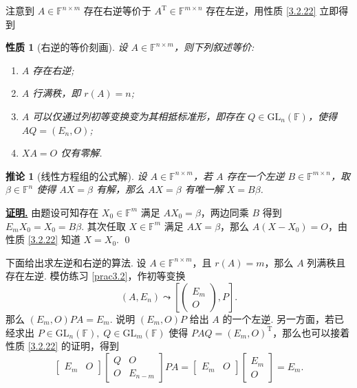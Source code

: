\documentclass[10pt,openany]{article}
\theoremstyle{thmstyle} %
\theoremstyle{defstyle} %
\newtheorem{corollary}[theorem]{推论}
\theoremstyle{prostyle} %
\newtheorem{property}[theorem]{性质}
\theoremstyle{exastyle}
\theoremstyle{remstyle}
\renewenvironment{proof}[1][证明]{\par\underline{\textbf{#1.}} \;\fangsong}{\qed\par}
\newcommand{\T}{^{\text{T}}}
\newcommand{\F}{\mathbb{F}}
\newcommand{\gfn}{\text{GL}_n(\mathbb{F})}
\newcommand{\gfm}{\text{GL}_m(\mathbb{F})}
\newcommand{\mn}{^{m \times n}}
\newcommand{\nm}{^{n \times m}}
\begin{document}
注意到 \( A \in \F\nm \) 存在右逆等价于 \( A\T \in \F\mn \) 存在左逆，用性质  \ref{3.2.22} 立即得到

\begin{property}[右逆的等价刻画] \label{3.2.23}
	设 \( A \in \F\nm \)，则下列叙述等价:
	\begin{enumerate}[(1)]
		\item \( A \) 存在右逆;
		\item \( A \) 行满秩，即 \( r(A)=n \);
		\item \( A \) 可以仅通过列初等变换变为其相抵标准形，即存在 \( Q \in \gfn \)，使得 \( AQ=(E_n,O) \);
		\item \( XA=O \) 仅有零解.
	\end{enumerate}
\end{property}

\begin{corollary}[线性方程组的公式解] \label{3.2.24}
	设 \( A \in \F\nm \)，若 \( A \) 存在一个左逆 \( B \in \F\mn \)，取 \( \beta \in \F^n \) 使得 \( AX=\beta \) 有解，那么 \( AX=\beta \) 有唯一解 \( X=B \beta \).
\end{corollary}

\begin{proof}
	由题设可知存在 \( X_0 \in \F^m \) 满足 \( AX_0=\beta \)，两边同乘 \( B \) 得到 \( E_mX_0=X_0=B\beta \). 其次任取 \( X \in \F^m \) 满足 \( AX=\beta \)，那么 \( A(X-X_0)=O \)，由性质 \ref{3.2.22} 知道 \( X=X_0 \). 
\end{proof}

下面给出求左逆和右逆的算法. 设 \( A \in \F\nm \)，且 \( r(A)=m \)，那么 \( A \) 列满秩且存在左逆. 模仿练习 \ref{prac3.2}，作初等变换
\[ (A,E_n) \leadsto \left[ \begin{pmatrix}
	E_m \\ O
\end{pmatrix}, P \right]. \]
那么 \( (E_m,O)PA=E_m \). 说明 \( (E_m,O)P \) 给出 \( A \) 的一个左逆. 另一方面，若已经求出 \( P \in \gfn, \; Q \in \gfm \) 使得 \( PAQ=(E_m,O)\T \)，那么也可以接着性质 \ref{3.2.22} 的证明，得到
\[ \begin{bmatrix}
	E_m & O
\end{bmatrix}\begin{bmatrix}
Q & O \\
O & E_{n-m}
\end{bmatrix}PA=\begin{bmatrix}
E_m & O
\end{bmatrix}\begin{bmatrix}
E_m \\ O
\end{bmatrix}=E_m. \]
\end{document}
